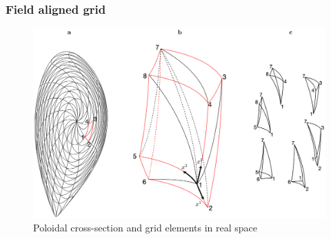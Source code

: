 \documentclass{beamer}
\begin{document}

\begin{frame}
\frametitle{Field aligned grid}
\vspace{-0.7cm}
\begin{center}
	\begin{figure}
		\includegraphics[trim={0cm 2cm 0cm 0cm},clip,width=1\textwidth]{FIGURES/curvilinear_grid_02.eps}
		\caption{Poloidal cross-section and grid elements in real space}
	\end{figure}
\end{center}
\end{frame}
\end{document}
